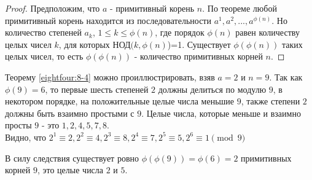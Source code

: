 \documentclass[twoside,12pt]{article}
\begin{document}
{\begin{proof} Предположим, что $a$ - примитивный корень $n$. По теореме любой примитивный корень находится из последовательности $a^{1}, a^{2},...,a^{\phi(n)}$. Но количество степеней $a_{k}$, $1\leq k \leq\phi(n)$, где порядок $\phi(n)$ равен количеству целых чисел $k$, для которых  $\text{НОД}(k,\phi(n)$)=1. Существует $\phi(\phi(n))$ таких целых чисел, то есть $\phi(\phi(n))$ - количество примитивных корней $n$.
\end{proof}

\bigskip
Теорему \ref{eightfour:8-4} можно проиллюстрировать, взяв $a=2$ и $n=9$. Так как $\phi(9)=6$, то первые шесть степеней $2$ должны делиться по модулю $9$, в некотором порядке, на положительные целые числа меньшие $9$, также степени $2$ должны быть взаимно простыми с $9$. Целые числа, которые меньше и взаимно просты $9$ - это $1,2,4,5,7,8$. \\Видно, что 
$2^{1}\equiv2,2^{2}\equiv4, 2^{3}\equiv8, 2^{4}\equiv7, 2^{5}\equiv5, 2^{6}\equiv1 \pmod{9}$  


\medskip
В силу следствия существует ровно $\phi(\phi(9))=\phi(6)=2$ примитивных корней $9$, это целые числа $2$ и $5$.\newpage
}
\end{document}
